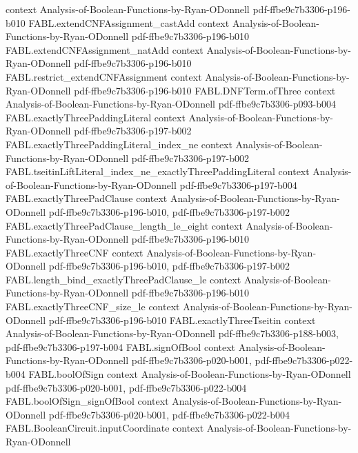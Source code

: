 \begin{theorem}
  {context}
  {Analysis-of-Boolean-Functions-by-Ryan-ODonnell}
  {pdf-ffbe9c7b3306-p196-b010}
\proofstep
  {FABL.extendCNFAssignment_castAdd}
  {context}
  {Analysis-of-Boolean-Functions-by-Ryan-ODonnell}
  {pdf-ffbe9c7b3306-p196-b010}
\proofstep
  {FABL.extendCNFAssignment_natAdd}
  {context}
  {Analysis-of-Boolean-Functions-by-Ryan-ODonnell}
  {pdf-ffbe9c7b3306-p196-b010}
\proofstep
  {FABL.restrict_extendCNFAssignment}
  {context}
  {Analysis-of-Boolean-Functions-by-Ryan-ODonnell}
  {pdf-ffbe9c7b3306-p196-b010}
\proofstep
  {FABL.DNFTerm.ofThree}
  {context}
  {Analysis-of-Boolean-Functions-by-Ryan-ODonnell}
  {pdf-ffbe9c7b3306-p093-b004}
\proofstep
  {FABL.exactlyThreePaddingLiteral}
  {context}
  {Analysis-of-Boolean-Functions-by-Ryan-ODonnell}
  {pdf-ffbe9c7b3306-p197-b002}
\proofstep
  {FABL.exactlyThreePaddingLiteral_index_ne}
  {context}
  {Analysis-of-Boolean-Functions-by-Ryan-ODonnell}
  {pdf-ffbe9c7b3306-p197-b002}
\proofstep
  {FABL.tseitinLiftLiteral_index_ne_exactlyThreePaddingLiteral}
  {context}
  {Analysis-of-Boolean-Functions-by-Ryan-ODonnell}
  {pdf-ffbe9c7b3306-p197-b004}
\proofstep
  {FABL.exactlyThreePadClause}
  {context}
  {Analysis-of-Boolean-Functions-by-Ryan-ODonnell}
  {pdf-ffbe9c7b3306-p196-b010,
    pdf-ffbe9c7b3306-p197-b002}
\proofstep
  {FABL.exactlyThreePadClause_length_le_eight}
  {context}
  {Analysis-of-Boolean-Functions-by-Ryan-ODonnell}
  {pdf-ffbe9c7b3306-p196-b010}
\proofstep
  {FABL.exactlyThreeCNF}
  {context}
  {Analysis-of-Boolean-Functions-by-Ryan-ODonnell}
  {pdf-ffbe9c7b3306-p196-b010,
    pdf-ffbe9c7b3306-p197-b002}
\proofstep
  {FABL.length_bind_exactlyThreePadClause_le}
  {context}
  {Analysis-of-Boolean-Functions-by-Ryan-ODonnell}
  {pdf-ffbe9c7b3306-p196-b010}
\proofstep
  {FABL.exactlyThreeCNF_size_le}
  {context}
  {Analysis-of-Boolean-Functions-by-Ryan-ODonnell}
  {pdf-ffbe9c7b3306-p196-b010}
\proofstep
  {FABL.exactlyThreeTseitin}
  {context}
  {Analysis-of-Boolean-Functions-by-Ryan-ODonnell}
  {pdf-ffbe9c7b3306-p188-b003,
    pdf-ffbe9c7b3306-p197-b004}
\proofstep
  {FABL.signOfBool}
  {context}
  {Analysis-of-Boolean-Functions-by-Ryan-ODonnell}
  {pdf-ffbe9c7b3306-p020-b001,
    pdf-ffbe9c7b3306-p022-b004}
\proofstep
  {FABL.boolOfSign}
  {context}
  {Analysis-of-Boolean-Functions-by-Ryan-ODonnell}
  {pdf-ffbe9c7b3306-p020-b001,
    pdf-ffbe9c7b3306-p022-b004}
\proofstep
  {FABL.boolOfSign_signOfBool}
  {context}
  {Analysis-of-Boolean-Functions-by-Ryan-ODonnell}
  {pdf-ffbe9c7b3306-p020-b001,
    pdf-ffbe9c7b3306-p022-b004}
\proofstep
  {FABL.BooleanCircuit.inputCoordinate}
  {context}
  {Analysis-of-Boolean-Functions-by-Ryan-ODonnell}

\end{theorem}
